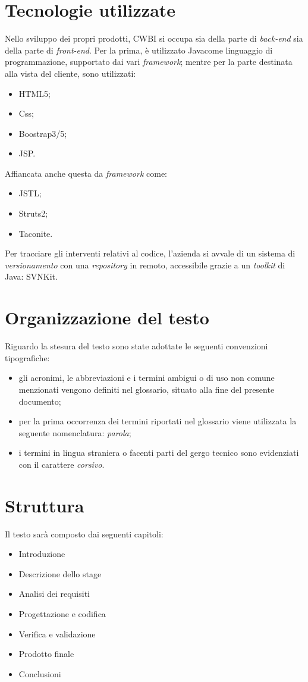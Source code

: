\section{Tecnologie utilizzate}
Nello sviluppo dei propri prodotti, CWBI si occupa sia della parte di \textit{back-end\glsfirstoccur\;} sia della parte di \textit{front-end\glsfirstoccur\;}.
Per la prima, è utilizzato Java\glsfirstoccur come linguaggio di programmazione, supportato dai vari \textit{framework\glsfirstoccur}; mentre per la parte destinata alla vista del cliente, sono utilizzati:
\begin{itemize}
\item HTML5\glsfirstoccur ;
\item Css\glsfirstoccur ;
\item Boostrap3/5\glsfirstoccur ;
\item JSP\glsfirstoccur .
\end{itemize}
Affiancata anche questa da \textit{framework} come: 
\begin{itemize}
\item JSTL\glsfirstoccur ;
\item Struts2\glsfirstoccur ;
\item Taconite\glsfirstoccur .
\end{itemize}
Per tracciare gli interventi relativi al codice, l'azienda si avvale di un sistema di \textit{versionamento\glsfirstoccur}\; con una \textit{repository\glsfirstoccur}\; in remoto, accessibile grazie a un \textit{toolkit} di Java: SVNKit\glsfirstoccur.

\section{Organizzazione del testo}
Riguardo la stesura del testo sono state adottate le seguenti convenzioni tipografiche:
\begin{itemize}
	\item gli acronimi, le abbreviazioni e i termini ambigui o di uso non comune menzionati vengono definiti nel glossario, situato alla fine del presente documento;
	\item per la prima occorrenza dei termini riportati nel glossario viene utilizzata la seguente nomenclatura: \emph{parola}\glsfirstoccur ;
	\item i termini in lingua straniera o facenti parti del gergo tecnico sono evidenziati con il carattere \emph{corsivo}.
\end{itemize}

\section{Struttura}
Il testo sarà composto dai seguenti capitoli:
\begin{itemize}
\item Introduzione
\item Descrizione dello stage
\item Analisi dei requisiti
\item Progettazione e codifica
\item Verifica e validazione
\item Prodotto finale
\item Conclusioni
\end{itemize}